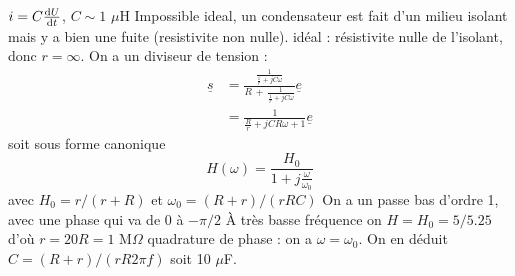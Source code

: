 \begin{solution}


\begin{questions}
    \questioncours $i = C\dv{U}{t}$, $C\sim 1$ $\mu$H
    \question Impossible ideal, un condensateur est fait d'un milieu isolant mais y a bien une fuite (resistivite non nulle). idéal : résistivite nulle de l'isolant, donc $r=\infty$.
    \question On a un diviseur de tension : 
    \begin{align*}
        \underline{s} &= \frac{\frac{1}{\frac{1}{r} + jC\omega}}{R\,+\,\frac{1}{\frac{1}{r} + jC\omega}}\underline{e} \\
        &= \frac{1}{\frac{R}{r} + jCR\omega + 1}\underline{e}
    \end{align*}     
    soit sous forme canonique
    $$ H(\omega) = \frac{H_0}{1 + j\frac{\omega}{\omega_0}}$$
    avec $H_0 = r/(r+R)$ et $\omega_0 = (R+r)/(rRC)$
    \question On a un passe bas d'ordre 1, avec une phase qui va de 0 à $-\pi/2$
    \question À très basse fréquence on $H = H_0 = 5/5.25$ d'où $r = 20 R = 1$ M$\Omega$
    \question quadrature de phase : on a $\omega = \omega_0$. On en déduit $C = (R+r)/(r R 2\pi f)$ soit 10 $\mu$F.
\end{questions}

\end{solution}